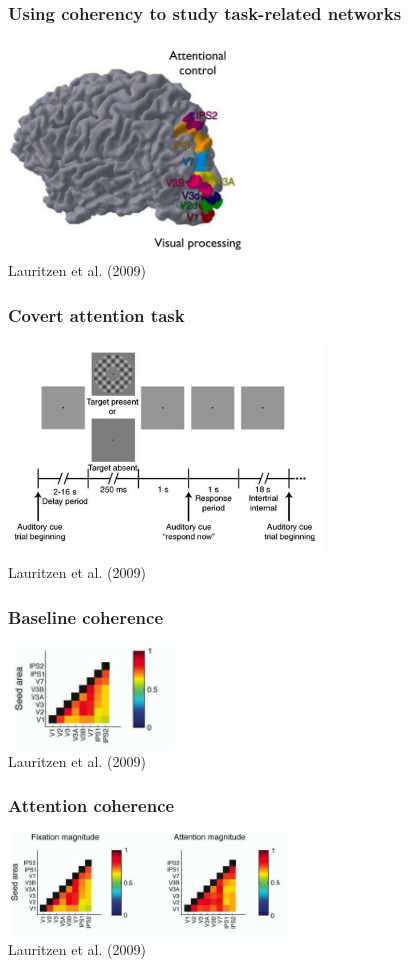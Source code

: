 \documentclass{beamer}
\begin{document}
\begin{frame}
\frametitle{Using coherency to study task-related networks}
\includegraphics[height=5.7cm]{figures/lauritzen1}
\\
\hfill 
Lauritzen et al. (2009)
\end{frame}


\begin{frame}
\frametitle{Covert attention task}
\includegraphics[height=5.7cm]{figures/lauritzen2}
\\
\hfill 
Lauritzen et al. (2009)
\end{frame}

\begin{frame}
\frametitle{Baseline coherence}
\includegraphics[height=2.7cm]{figures/lauritzen3}
\\
\hfill 
Lauritzen et al. (2009)
\end{frame}

\begin{frame}
\frametitle{Attention coherence}
\includegraphics[height=2.7cm]{figures/lauritzen4}
\\
\hfill 
Lauritzen et al. (2009)
\end{frame}
\end{document}
